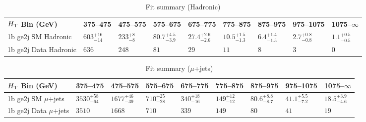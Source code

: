 \documentclass[8pt]{article}
\def\scalht{\mbox{$H_{\rm{T}}$}\xspace}
\newcommand\T{\rule{0pt}{2.6ex}}
\begin{document}
\begin{table}[ht!]
\caption{Fit summary (Hadronic)}
\label{tab:ensemble-summary}
\centering
\begin{tabular}{ lllllllll }

\hline
\scalht Bin (GeV)       & 375--475                       & 475--575                       & 575--675                       & 675--775                       & 775--875                       & 875--975                       & 975--1075                      & 1075--$\infty$                 \\ [1.000000ex]
\hline
1b ge2j SM Hadronic\T   & $603^{+16}_{-14}$              & $233^{+8}_{-8}$                & $80.7^{+4.5}_{-3.9}$           & $27.4^{+2.6}_{-2.6}$           & $10.5^{+1.5}_{-1.3}$           & $6.4^{+1.4}_{-1.5}$            & $2.7^{+0.8}_{-0.8}$            & $1.1^{+0.5}_{-0.5}$            \\ 
1b ge2j Data Hadronic\T & $636$                          & $248$                          & $81$                           & $29$                           & $11$                           & $8$                            & $3$                            & $0$                            \\ 
\hline

\end{tabular}
\end{table}
\begin{table}[ht!]
\caption{Fit summary ($\mu$+jets)}
\label{tab:ensemble-summary}
\centering
\begin{tabular}{ lllllllll }

\hline
\scalht Bin (GeV)       & 375--475                       & 475--575                       & 575--675                       & 675--775                       & 775--875                       & 875--975                       & 975--1075                      & 1075--$\infty$                 \\ [1.000000ex]
\hline
1b ge2j SM $\mu$+jets\T & $3530^{+58}_{-64}$             & $1677^{+46}_{-39}$             & $710^{+25}_{-28}$              & $340^{+18}_{-16}$              & $149^{+12}_{-12}$              & $80.6^{+8.8}_{-8.7}$           & $41.1^{+5.5}_{-7.2}$           & $18.5^{+3.9}_{-4.6}$           \\ 
1b ge2j Data $\mu$+jets\T & $3510$                         & $1668$                         & $710$                          & $339$                          & $149$                          & $80$                           & $41$                           & $19$                           \\ 
\hline

\end{tabular}
\end{table}
\end{document}
